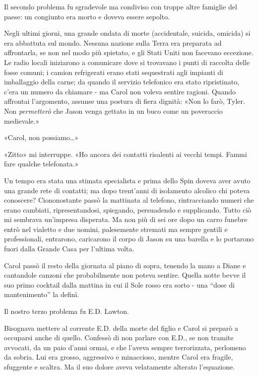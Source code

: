 Il secondo problema fu sgradevole ma condiviso con troppe altre famiglie
del paese: un congiunto era morto e doveva essere sepolto.

Negli ultimi giorni, una grande ondata di morte (accidentale, suicida,
omicida) si era abbattuta sul mondo. Nessuna nazione sulla Terra era
preparata ad affrontarla, se non nel modo più spietato, e gli Stati
Uniti non facevano eccezione. Le radio locali iniziarono a comunicare
dove si trovavano i punti di raccolta delle fosse comuni; i camion
refrigerati erano stati sequestrati agli impianti di imballaggio della
carne; da quando il servizio telefonico era stato ripristinato, c'era un
numero da chiamare - ma Carol non voleva sentire ragioni. Quando
affrontai l'argomento, assunse una postura di fiera dignità: «Non lo
farò, Tyler. Non \emph{permetterò} che Jason venga gettato in un buco
come un poveraccio medievale.»

«Carol, non possiamo\ldots»

«Zitto» mi interruppe. «Ho ancora dei contatti risalenti ai vecchi
tempi. Fammi fare qualche telefonata.»

Un tempo era stata una stimata specialista e prima dello Spin doveva
aver avuto una grande rete di contatti; ma dopo trent'anni di isolamento
alcolico chi poteva conoscere? Ciononostante passò la mattinata al
telefono, rintracciando numeri che erano cambiati, ripresentandosi,
spiegando, persuadendo e supplicando. Tutto ciò mi sembrava un'impresa
disperata. Ma non più di sei ore dopo un carro funebre entrò nel
vialetto e due uomini, palesemente stremati ma sempre gentili e
professionali, entrarono, caricarono il corpo di Jason su una barella e
lo portarono fuori dalla Grande Casa per l'ultima volta.

Carol passò il resto della giornata al piano di sopra, tenendo la mano a
Diane e cantandole canzoni che probabilmente non poteva sentire. Quella
notte bevve il suo primo cocktail dalla mattina in cui il Sole rosso era
sorto - una ``dose di mantenimento'' la definì.

Il nostro terzo problema fu E.D. Lawton.

\separatorefiori

Bisognava mettere al corrente E.D. della morte del figlio e Carol si
preparò a occuparsi anche di quello. Confessò di non parlare con E.D.,
se non tramite avvocati, da un paio d'anni ormai, e che l'aveva sempre
terrorizzata, perlomeno da sobria. Lui era grosso, aggressivo e
minaccioso, mentre Carol era fragile, sfuggente e scaltra. Ma il suo
dolore aveva velatamente alterato l'equazione.

